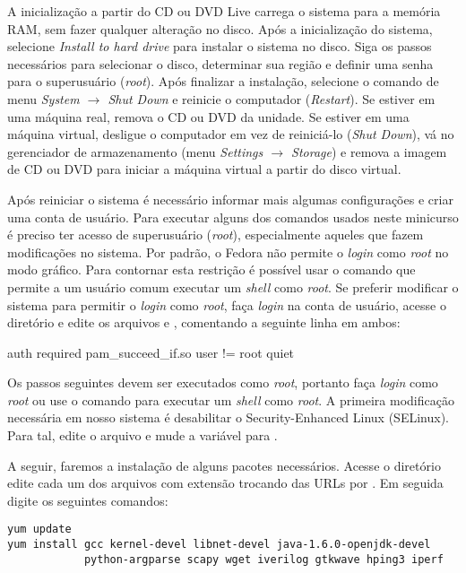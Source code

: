 A inicialização a partir do CD ou DVD Live carrega o sistema para a
memória RAM, sem fazer qualquer alteração no disco. Após a inicialização
do sistema, selecione \emph{Install to hard drive} para instalar o
sistema no disco.  Siga os passos necessários para selecionar o disco,
determinar sua região e definir uma senha para o superusuário
(\emph{root}). Após finalizar a instalação, selecione o comando de menu
\emph{System $\rightarrow$ Shut Down} e reinicie o computador
(\emph{Restart}). Se estiver em uma máquina real, remova o CD ou DVD da
unidade. Se estiver em uma máquina virtual, desligue o computador em vez
de reiniciá-lo (\emph{Shut Down}), vá no gerenciador de armazenamento
(menu \emph{Settings $\rightarrow$ Storage}) e remova a imagem de CD ou
DVD para iniciar a máquina virtual a partir do disco virtual.

Após reiniciar o sistema é necessário informar mais algumas
configurações e criar uma conta de usuário. Para executar alguns dos
comandos usados neste minicurso é preciso ter acesso de superusuário
(\emph{root}), especialmente aqueles que fazem modificações no sistema.
Por padrão, o Fedora não permite o \emph{login} como \emph{root} no modo
gráfico. Para contornar esta restrição é possível usar o comando
 que permite a um usuário comum executar um \emph{shell} como
\emph{root}. Se preferir modificar o sistema para permitir o
\emph{login} como \emph{root}, faça \emph{login} na conta de usuário,
acesse o diretório  e edite os arquivos  e
, comentando a seguinte linha em ambos:

\begin{verbnobox}[\small]
auth   required    pam_succeed_if.so user != root quiet
\end{verbnobox}

Os passos seguintes devem ser executados como \emph{root}, portanto faça
\emph{login} como \emph{root} ou use o comando  para executar
um \emph{shell} como \emph{root}.  A primeira modificação
necessária em nosso sistema é desabilitar o Security-Enhanced Linux
(SELinux). Para tal, edite o arquivo  e mude a
variável  para .

A seguir, faremos a instalação de alguns pacotes necessários. Acesse o
diretório  edite cada um dos arquivos com
extensão  trocando  das URLs por . Em
seguida digite os seguintes comandos:

\begin{verbatim}
yum update
yum install gcc kernel-devel libnet-devel java-1.6.0-openjdk-devel
            python-argparse scapy wget iverilog gtkwave hping3 iperf
\end{verbatim}

